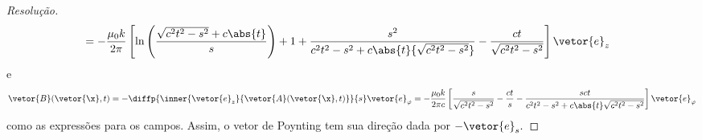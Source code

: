 \begin{proof}[Resolução]
\begin{align*}
      &= -\frac{\mu_0 k}{2\pi} \left[\ln\left(\frac{\sqrt{c^2 t^2 - s^2} + c \abs{t}}{s}\right) + 1 + \frac{s^2}{c^2 t^2 - s^2 + c \abs{t}{\sqrt{c^2 t^2 - s^2}}} - \frac{c t}{\sqrt{c^2 t^2 - s^2}}\right] \vetor{e}_z
   \end{align*}
   e
   \begin{equation*}
      \vetor{B}(\vetor{\x}, t) = -\diffp{\inner{\vetor{e}_z}{\vetor{A}(\vetor{\x}, t)}}{s}\vetor{e}_\varphi =  
      -\frac{\mu_0 k}{2\pi c} \left[\frac{s}{\sqrt{c^2 t^2 - s^2}} - \frac{ct}{s} - \frac{s ct}{c^2 t^2  - s^2 + c \abs{t} \sqrt{c^2 t^2 - s^2}}\right] \vetor{e}_\varphi
   \end{equation*}
   como as expressões para os campos. Assim, o vetor de Poynting tem sua direção dada por \(- \vetor{e}_s.\)
\end{proof}
